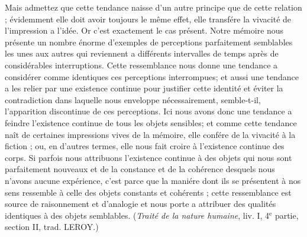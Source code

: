 Mais admettez que cette tendance naisse d’un autre
principe que de cette relation ; évidemment elle doit avoir
toujours le même effet, elle transfére la vivacité de l'impression
a l’idée. Or c’est exactement le cas présent. Notre
mémoire nous présente un nombre énorme d’exemples
de perceptions parfaitement semblables les unes aux
autres qui reviennent a différents intervalles de temps
après de considérables interruptions. Cette ressemblance
nous donne une tendance a considérer comme identiques
ces perceptions interrompues; et aussi une tendance a
les relier par une existence continue pour justifier cette
identité et éviter la contradiction dans laquelle nous
enveloppe nécessairement, semble-t-il, l'apparition discontinue
de ces perceptions. Ici nous avons donc une
tendance a feindre l’existence continue de tous les objets
sensibles; et comme cette tendance naît de certaines
impressions vives de la mémoire, elle confére de la vivacité
à la fiction ; ou, en d’autres termes, elle nous fait croire à
l'existence continue des corps. Si parfois nous attribuons
l'existence continue à des objets qui nous sont parfaitement
nouveaux et de la constance et de la cohérence
desquels nous n’avons aucune expérience, c’est parce
que la maniére dont ils se présentent à nos sens ressemble
à celle des objets constants et cohérents ; cette ressemblance
est source de raisonnement et d’analogie et nous
porte a attribuer des qualités identiques à des objets
semblables. ({\it Traité de la nature humaine}, liv. I, 4$^\text{e}$ partie,
section II, trad. L{\footnotesize EROY}.)

